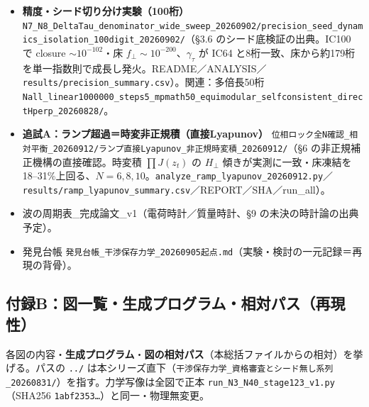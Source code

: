 \documentclass[
  a4paper,
]{ltjsarticle}
\providecommand{\tightlist}{%
  \setlength{\itemsep}{0pt}\setlength{\parskip}{0pt}}
\begin{document}
\begin{itemize}
\tightlist
\item
  \textbf{精度・シード切り分け実験（100桁）}
  \texttt{N7\_N8\_DeltaTau\_denominator\_wide\_sweep\_20260902/precision\_seed\_dynamics\_isolation\_100digit\_20260902/}（§3.6
  のシード底検証の出典。IC100 で closure \(\sim10^{-102}\)・床
  \(f_\perp\sim10^{-200}\)、\(\gamma_\tau\) が IC64
  と8桁一致、床から約179桁を単一指数則で成長し発火。README／ANALYSIS／\texttt{results/precision\_summary.csv}）。関連：多倍長50桁
  \texttt{Nall\_linear1000000\_steps5\_mpmath50\_equimodular\_selfconsistent\_directHperp\_20260828/}。
\item
  \textbf{追試A：ランプ超過＝時変非正規積（直接Lyapunov）}
  \texttt{位相ロック全N確認\_相対平衡\_20260912/ランプ直接Lyapunov\_非正規時変積\_20260912/}（§6
  の非正規補正機構の直接確認。時変積 \(\prod J(z_t)\) の \(H_\perp\)
  傾きが実測に一致・床凍結を18--31\%上回る、\(N=6,8,10\)。\texttt{analyze\_ramp\_lyapunov\_20260912.py}／\texttt{results/ramp\_lyapunov\_summary.csv}／REPORT／SHA／run\_all）。
\item
  波の周期表\_完成論文\_v1（電荷時計／質量時計、§9
  の未決の時計論の出典予定）。
\item
  発見台帳
  \texttt{発見台帳\_干渉保存力学\_20260905起点.md}（実験・検討の一元記録＝再現の背骨）。
\end{itemize}

\subsection{付録B：図一覧・生成プログラム・相対パス（再現性）}\label{ux4ed8ux9332bux56f3ux4e00ux89a7ux751fux6210ux30d7ux30edux30b0ux30e9ux30e0ux76f8ux5bfeux30d1ux30b9ux518dux73feux6027}

各図の内容・\textbf{生成プログラム}・\textbf{図の相対パス}（本総括ファイルからの相対）を挙げる。パスの
\texttt{../}
は本シリーズ直下（\texttt{干渉保存力学\_資格審査とシード無し系列\_20260831/}）を指す。力学写像は全図で正本
\texttt{run\_N3\_N40\_stage123\_v1.py}（SHA256
\texttt{1abf2353…}）と同一・物理無変更。
\end{document}
